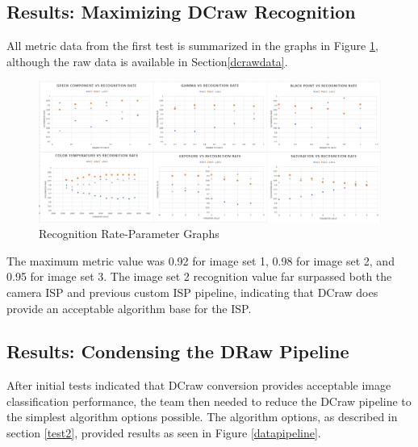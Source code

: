 \documentclass{report}
\begin{document}
\subsection{Results: Maximizing DCraw Recognition}
\label{resultst1}
All metric data from the first test is summarized in the graphs in Figure \ref{overallgraphs}, although the raw data is available in Section\ref{dcrawdata}.

\begin{figure}[!htb]
	\begin{center}
		\label{overallgraphs}
		\caption{Recognition Rate-Parameter Graphs}
		\includegraphics[scale=0.3]{all_graphs.png}
	\end{center}
\end{figure}

The maximum metric value was 0.92 for image set 1, 0.98 for image set 2, and 0.95 for image set 3. The image set 2 recognition value far surpassed both the camera ISP and previous custom ISP pipeline, indicating that DCraw does provide an acceptable algorithm base for the ISP.

\subsection{Results: Condensing the DRaw Pipeline} \label{results2}
After initial tests indicated that DCraw conversion provides acceptable image classification performance, the team then needed to reduce the DCraw pipeline to the simplest algorithm options possible. The algorithm options, as described in section \ref{test2}, provided results as seen in Figure \ref{datapipeline}.
\end{document}
